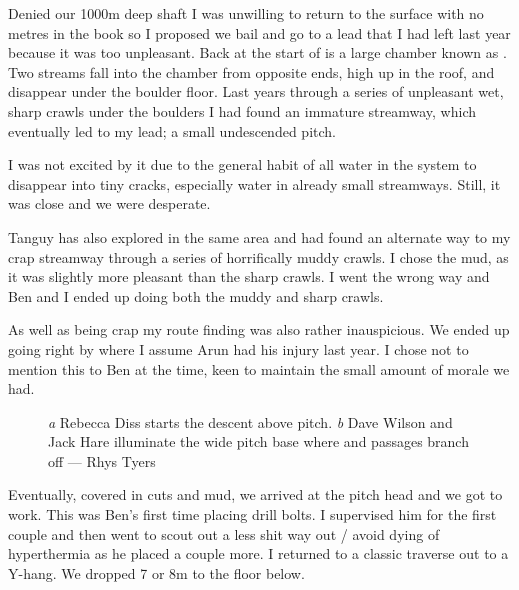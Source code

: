 Denied our 1000m deep shaft I was unwilling to return to the surface with no metres in the book so I proposed we bail and go to a lead that I had left last year because it was too unpleasant. Back at the start of  is a large chamber known as . Two streams fall into the chamber from opposite ends, high up in the roof, and disappear under the boulder floor. Last years through a series of unpleasant wet, sharp crawls under the boulders I had found an immature streamway, which eventually led to my lead; a small undescended pitch.
 
I was not excited by it due to the general habit of all water in the system to disappear into tiny cracks, especially water in already small streamways. Still, it was close and we were desperate.
 
Tanguy has also explored in the same area and had found an alternate way to my crap streamway through a series of horrifically muddy crawls. I chose the mud, as it was slightly more pleasant than the sharp crawls. I went the wrong way and Ben and I ended up doing both the muddy and sharp crawls.
 
As well as being crap my route finding was also rather inauspicious. We ended up going right by where I assume Arun had his injury last year. I chose not to mention this to Ben at the time, keen to maintain the small amount of morale we had.

 \begin{figure}[t!]
\checkoddpage \ifoddpage \forcerectofloat \else \forceversofloat \fi
\centering
\begin{subfigure}[t]{0.685\textwidth}
\centering
{}
 \caption{}\label{water hallelujah}
\end{subfigure}
    \hfill
    \begin{subfigure}[t]{0.305\textwidth}
        \centering
        \caption{} \label{Diss and Dave}
    \end{subfigure}
    \caption{
    \emph{a} Rebecca Diss starts the descent above  pitch.
    \emph{b} Dave Wilson and Jack Hare illuminate the wide pitch base where  and  passages branch off --- Rhys Tyers}
\end{figure}
 
Eventually, covered in cuts and mud, we arrived at the pitch head and we got to work. This was Ben's first time placing drill bolts. I supervised him for the first couple and then went to scout out a less shit way out / avoid dying of hyperthermia as he placed a couple more. I returned to a classic traverse out to a Y-hang. We dropped 7 or 8m to the floor below.
 
